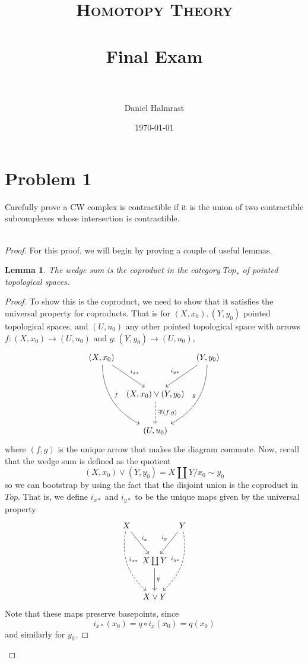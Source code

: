 \documentclass[fontsize=11pt]{scrartcl} %
\title{	
\normalfont \normalsize 
\textsc{Homotopy Theory} \\ [25pt] %
\horrule{0.5pt} \\[0.4cm] %
\huge Final Exam \\ %
\horrule{2pt} \\[0.5cm] %
}
\author{Daniel Halmrast} %
\date{\normalsize\today} %
\numberwithin{equation}{section} %
\numberwithin{figure}{section} %
\numberwithin{table}{section} %
\newtheorem{lemma}{Lemma}
\begin{document}
\maketitle %

\section*{Problem 1}
Carefully prove a CW complex is contractible if it is the union of two
contractible subcomplexes whose intersection is contractible.
\\
\\
\begin{proof}
    For this proof, we will begin by proving a couple of useful lemmas.
    \begin{lemma}
        The wedge sum is the coproduct in the category $Top_*$ of pointed
        topological spaces.
    \end{lemma}
    \begin{proof}
        To show this is the coproduct, we need to show that it satisfies the
        universal property for coproducts. That is for $(X,x_0),(Y,y_0)$ pointed
        topological spaces, and $(U,u_0)$ any other pointed topological space
        with arrows $f:(X,x_0)\to (U,u_0)$ and $g:(Y,y_0)\to (U,u_0)$,
        \[
            \begin{tikzcd}[column sep=tiny, row sep=large]
                (X,x_0)\ar[dr,"i_{x*}"]\ar[ddr,"f", bend right]
                &&(Y,y_0)\ar[dl,"i_{y*}"'] \ar[ddl,"g"', bend left]\\
                &(X,x_0)\vee (Y,y_0)\ar[d, "\exists !{(f,g)}",dashed]\\
                &(U,u_0)
\end{tikzcd}
        \]
    where $(f,g)$ is the unique arrow that makes the diagram commute. Now,
    recall that the wedge sum is defined as the quotient
    \[
        (X,x_0)\vee (Y,y_0) = X\coprod Y/{x_0\sim y_0}
    \]
    so we can bootstrap by using the fact that the disjoint union is the
    coproduct in $Top$. That is, we define $i_{x*}$ and $i_{y*}$ to be the
    unique maps given by the universal property
    \[
        \begin{tikzcd}[column sep=tiny, row sep=large]
    X\ar[dr,"i_x"]\ar[ddr, "i_{x*}",dashed, bend right] &&Y\ar[dl, "i_y"']\ar[ddl,
    "i_{y*}"',dashed, bend left]\\
    &X\coprod Y\ar[d,"q"]\\
    &X\vee Y
\end{tikzcd}
    \]
    Note that these maps preserve basepoints, since 
    \[
        i_{x*}(x_0) = q\circ i_x(x_0) = q(x_0)
    \]
    and similarly for $y_0$. 
    

\end{proof}
\end{proof}
\end{document}

